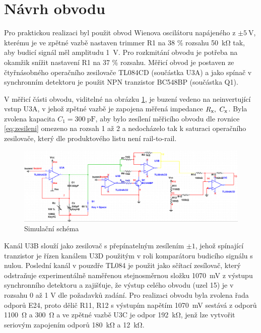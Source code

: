 \documentclass[twoside]{article}
\newcommand{\Cx}{C_{\rm x}}
\newcommand{\Rx}{R_{\rm x}}
\begin{document}
\clearpage
\section{Návrh obvodu}


Pro praktickou realizaci byl použit obvod Wienova oscilátoru napájeného z $\pm \SI{5}{\volt}$,
kterému je ve zpětné vazbě nastaven trimmer R1 na 38 \% rozsahu \SI{50}{\kilo\ohm}
tak, aby budicí signál měl amplitudu \SI{1}{\volt}.
Pro rozkmitání obvodu je potřeba na okamžik snížit nastavení R1 na 37 \% rozsahu.
Měřicí obvod je postaven ze
čtyřnásobného operačního zesilovače TL084CD (součástka U3A) 
a jako spínač v synchronním detektoru
je použit NPN tranzistor BC548BP (součástka Q1).


V měřicí části obvodu, viditelné na obrázku \ref{schema}, je buzení 
vedeno na neinvertující vstup U3A, v jehož zpětné vazbě je 
zapojena měřená impedance $\Rx,~\Cx$. Byla zvolena kapacita $C_1 = \SI{300}{\pico\farad}$,
aby bylo zesílení měřicího obvodu dle rovnice \eqref{eq:zesileni} omezeno na rozsah 1 až 2
a nedocházelo tak k saturaci operačního zesilovače, který dle produktového listu není
rail-to-rail.

\begin{figure}[h]
    \centering
    \includegraphics[width=\textwidth]{schema.png}
    \caption{Simulační schéma}
    \label{schema}
\end{figure}

Kanál U3B slouží jako zesilovač s přepínatelným zesílením $\pm 1$, jehož spínající
tranzistor je řízen kanálem U3D použitým v roli komparátoru budicího signálu s nulou.
Poslední kanál v pouzdře TL084 je použit jako sčítací zesílovač, který odstraňuje
experimentálně naměřenou stejnosměrnou složku \SI{1070}{\milli\volt} z
výstupu synchronního detektoru a zajišťuje, že výstup 
celého obvodu (uzel 15) je v rozsahu 0 až 1 V dle požadavků zadání.
Pro realizaci obvodu byla zvolena řada odporů E24, proto dělič R11, R12
s výstupím napětím \SI{1070}{\milli\volt} sestává z odporů \SI{1100}{\ohm} a \SI{300}{\ohm}
a ve zpětné vazbě U3C je odpor \SI{192}{\kilo\ohm}, jenž lze vytvořit seriovým zapojením
odporů \SI{180}{\kilo\ohm} a \SI{12}{\kilo\ohm}.
\end{document}
